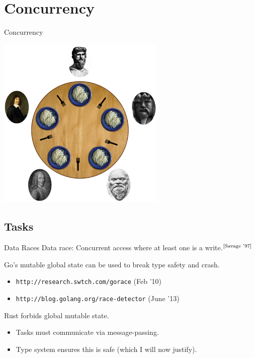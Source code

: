 \documentclass[xcolor=dvipsnames]{beamer}
\begin{document}
\section{Concurrency}

\begin{frame}{Concurrency}
	\begin{center}
	\includegraphics[width=0.6\textwidth]{concurrency.jpg}
	\end{center}
\end{frame}

\subsection{Tasks}

\begin{frame}{Data Races}
        Data race: Concurrent access where at least one is a write.$^{\small \text{[Savage '97]}}$
        \linegap

        Go's mutable global state can be used to break type safety and crash.
        \begin{itemize}
                \item \texttt{http://research.swtch.com/gorace} (Feb '10)
                \item \texttt{http://blog.golang.org/race-detector} (June '13)
        \end{itemize}
        \pause
        \linegap

        Rust forbids global mutable state.
        \begin{itemize}
                \item Tasks must communicate via message-passing.
		\item Type system ensures this is safe (which I will now justify).
        \end{itemize}
\end{frame}
\end{document}
